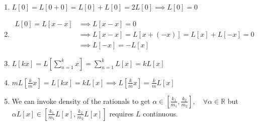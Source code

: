 \documentclass[12pt]{article}
\newcommand{\R}{\mathbb{R}}
\begin{document}
\begin{enumerate}
    \item $L[0] = L[0 + 0] = L[0] + L[0] = 2L[0] \implies L[0] = 0$
    \item \begin{align*}
        L[0] = L[x - x] &\implies L[x - x] = 0\\ 
        &\implies L[x - x] = L[x + (-x)] = L[x] + L[-x] = 0\\ 
        &\implies L[-x] = -L[x]
    \end{align*}
    \item $L[kx] = L\left[\sum_{n=1}^k x\right] = \sum_{n=1}^k L[x] = k L[x]$
    \item $m L[\frac{k}{m}x] = L[kx] = kL[x] \implies L[\frac{k}{m}x] = \frac km L[x]$ 
    
    \item We can invoke density of the rationals to get $\alpha \in [\frac{k_1}{m_1}, \frac{k_2}{m_2}], \quad \forall \alpha \in \R$ but $\alpha L[x] \in [\frac{k_1}{m_1} L[x], \frac{k_2}{m_2} L[x]]$ requires $L$ continuous. 
\end{enumerate}
\end{document}
